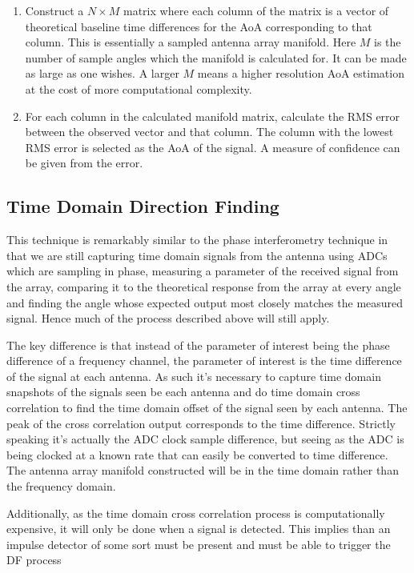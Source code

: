\begin{enumerate}
  \item Construct a \(N \times M\) matrix where each column of the matrix is a vector of theoretical baseline time differences for the AoA corresponding to that column. This is essentially a sampled antenna array manifold. Here \(M\) is the number of sample angles which the manifold is calculated for. It can be made as large as one wishes. A larger \(M\) means a higher resolution AoA estimation at the cost of more computational complexity.
  \item For each column in the calculated manifold matrix, calculate the RMS error between the observed vector and that column. The column with the lowest RMS error is selected as the AoA of the signal. A measure of confidence can be given from the error.
\end{enumerate}

\subsection{Time Domain Direction Finding}
This technique is remarkably similar to the phase interferometry technique in that we are still capturing time domain signals from the antenna using ADCs which are sampling in phase, measuring a parameter of the received signal from the array, comparing it to the theoretical response from the array at every angle and finding the angle whose expected output most closely matches the measured signal. Hence much of the process described above will still apply.

The key difference is that instead of the parameter of interest being the phase difference of a frequency channel, the parameter of interest is the time difference of the signal at each antenna. As such it's necessary to capture time domain snapshots of the signals seen be each antenna and do time domain cross correlation to find the time domain offset of the signal seen by each antenna. The peak of the cross correlation output corresponds to the time difference. Strictly speaking it's actually the ADC clock sample difference, but seeing as the ADC is being clocked at a known rate that can easily be converted to time difference. The antenna array manifold constructed will be in the time domain rather than the frequency domain.

Additionally, as the time domain cross correlation process is computationally expensive, it will only be done when a signal is detected. This implies than an impulse detector of some sort must be present and must be able to trigger the DF process

